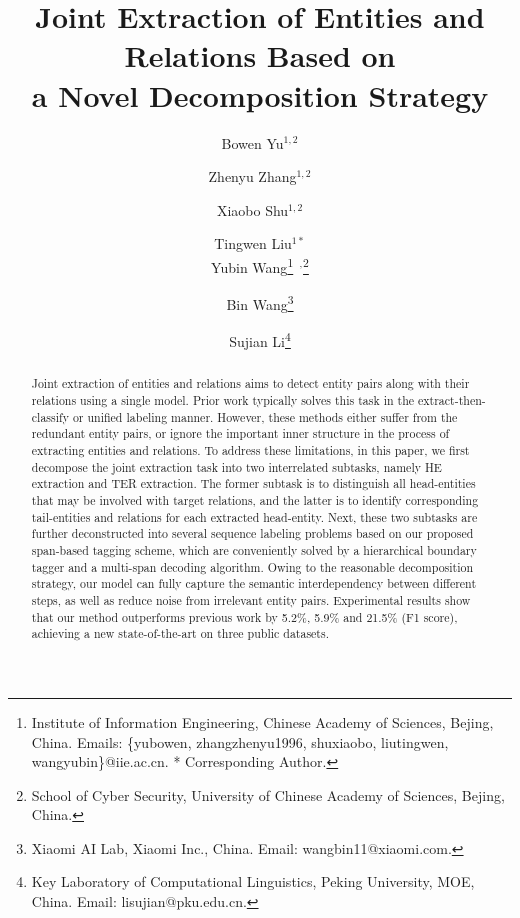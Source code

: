 \documentclass{ecai}
\begin{document}
\title{Joint Extraction of Entities and Relations Based on \\ a Novel Decomposition Strategy}

\author{
Bowen Yu$^{1,2}$
\and Zhenyu Zhang$^{1,2}$
\and Xiaobo Shu$^{1,2}$
\and Tingwen Liu$^{1*}$ 
\\ Yubin Wang\thanks{Institute of Information Engineering, Chinese Academy of Sciences, Bejing, China. Emails: \{yubowen, zhangzhenyu1996, shuxiaobo, liutingwen, wangyubin\}@iie.ac.cn. * Corresponding Author.} $^{\,,}$\thanks{School of Cyber Security, University of Chinese Academy of Sciences, Bejing, China.}
\and Bin Wang\thanks{Xiaomi AI Lab, Xiaomi Inc., China. Email: wangbin11@xiaomi.com.}
\and Sujian Li\thanks{Key Laboratory of Computational Linguistics, Peking University, MOE, China. Email: lisujian@pku.edu.cn.}}

\maketitle


\begin{abstract}
Joint extraction of entities and relations aims to detect entity pairs along with their relations using a single model.
Prior work typically solves this task in the extract-then-classify or unified labeling manner.
However, these methods either suffer from the redundant entity pairs, or ignore the important inner structure in the process of extracting entities and relations.
To address these limitations, in this paper, we first decompose the joint extraction task into two interrelated subtasks, namely HE extraction and TER extraction.
The former subtask is to distinguish all head-entities that may be involved with target relations, and the latter is to identify corresponding tail-entities and relations for each extracted head-entity. 
Next, these two subtasks are further deconstructed into several sequence labeling problems based on our proposed span-based tagging scheme, which are conveniently solved by a hierarchical boundary tagger and a multi-span decoding algorithm.
Owing to the reasonable decomposition strategy, our model can fully capture the semantic interdependency between different steps, as well as reduce noise from irrelevant entity pairs.
Experimental results show that our method outperforms previous work by 5.2\%, 5.9\% and 21.5\% (F1 score), achieving a new state-of-the-art on three public datasets.
\end{abstract}
\end{document}
